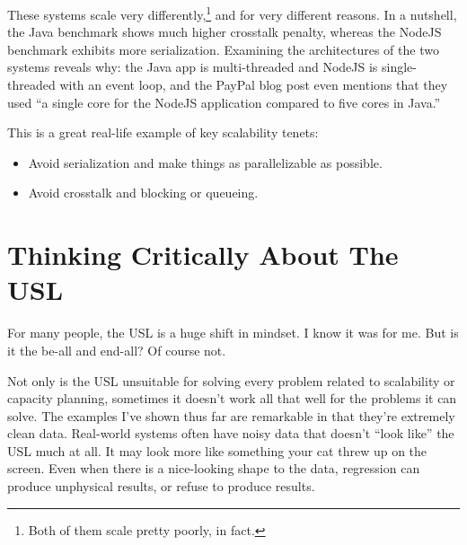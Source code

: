 \documentclass{vivid_layout}
\begin{document}
These systems scale very differently,\footnote{Both of them scale pretty poorly,
in fact.} and for very different reasons.  In a nutshell, the Java benchmark
shows much higher crosstalk penalty, whereas the NodeJS benchmark exhibits more
serialization. Examining the architectures of the two systems reveals why: the
Java app is multi-threaded and NodeJS is single-threaded with an event loop, and
the PayPal blog post even mentions that they used ``a single core for the
NodeJS application compared to five cores in Java.''

This is a great real-life example of key scalability tenets:

\begin{itemize}
\item Avoid serialization and make things as parallelizable as possible.
\item Avoid crosstalk and blocking or queueing.
\end{itemize}

\section{Thinking Critically About The USL}

For many people, the USL is a huge shift in mindset. I know it was for me. But
is it the be-all and end-all? Of course not.

Not only is the USL unsuitable for solving every problem related to scalability
or capacity planning, sometimes it doesn't work all that well for the problems
it can solve. The examples I've shown thus far are remarkable in that they're
extremely clean data. Real-world systems often have noisy data that doesn't
``look like'' the USL much at all. It may look more like something your cat
threw up on the screen. Even when there is a nice-looking shape to the data,
regression can produce unphysical results, or refuse to produce results.
\end{document}

